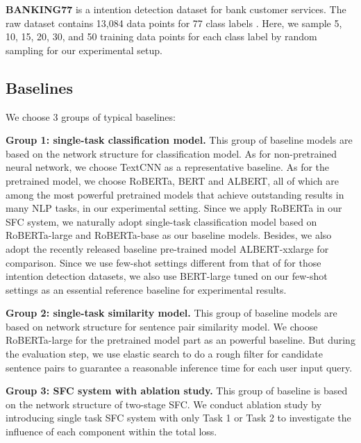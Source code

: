 \documentclass[letterpaper]{article} %
\begin{document}
  \textbf{BANKING77}  is  a intention detection dataset for bank customer services.
  The    raw    dataset    contains    13,084   data   points   for   77   class
  labels \cite{casanueva2020efficient}.  Here,  we  sample 5, 10, 15, 20, 30, and 50 training
  data  points  for  each  class  label  by random sampling for our experimental
  setup.


  \subsection{Baselines}
  We choose 3 groups of typical baselines:

  \textbf{Group  1:  single-task  classification  model.} This group of baseline
  models  are  based  on  the network structure for classification model. As for
  non-pretrained  neural  network, we choose TextCNN \cite{kim2014convolutional}
  as  a representative baseline. As for the pretrained model, we choose RoBERTa,
  BERT  and  ALBERT,  all of which are among the most powerful pretrained models
  that  achieve  outstanding  results  in  many  NLP  tasks, in our experimental
  setting.  Since  we  apply  RoBERTa  in  our  SFC  system,  we naturally adopt
  single-task  classification  model  based on RoBERTa-large and RoBERTa-base as
  our  baseline  models.  Besides,  we also adopt the recently released baseline
  pre-trained model ALBERT-xxlarge \cite{lan2019albert} for comparison. Since we
  use few-shot settings different from that of \cite{casanueva2020efficient} for
  those  intention  detection  datasets,  we  also  use  BERT-large tuned on our
  few-shot settings as an essential reference baseline for experimental results.

  \textbf{Group  2: single-task similarity model.} This group of baseline models
  are   based   on   network   structure   for   sentence pair similarity   model. We choose RoBERTa-large for the pretrained model part as an
  powerful baseline. But during the evaluation step, we use elastic search to do
  a  rough  filter  for  candidate  sentence  pairs  to  guarantee  a reasonable
  inference time for each user input query.

  \textbf{Group  3:  SFC  system with ablation study.} This group of baseline is
  based  on  the network structure of two-stage SFC. We
  conduct  ablation study by introducing single task SFC system with only Task 1
  or  Task  2  to  investigate  the influence of each component within the total
  loss.
\end{document}
